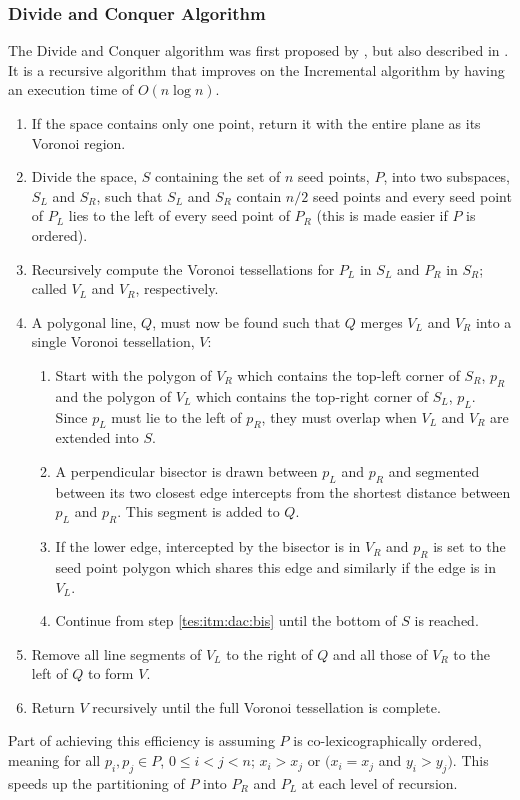 \subsubsection{Divide and Conquer Algorithm}\label{tes:ssec:dac}
The Divide and Conquer algorithm was first proposed by \citet{shamos1975closest}, but also described in \citep{okabe2009spatial}. It is a recursive algorithm that improves on the Incremental algorithm by having an execution time of $O(n\log n)$.
\begin{enumerate}
\item If the space contains only one point, return it with the entire plane as its Voronoi region.
\item Divide the space, $S$ containing the set of $n$ seed points, $P$, into two subspaces, $S_L$ and $S_R$, such that $S_L$ and $S_R$ contain $n/2$ seed points and every seed point of $P_L$ lies to the left of every seed point of $P_R$ (this is made easier if $P$ is ordered).
\item Recursively compute the Voronoi tessellations for $P_L$ in $S_L$ and $P_R$ in $S_R$; called $V_L$ and $V_R$, respectively.
\item A polygonal line, $Q$, must now be found such that $Q$ merges $V_L$ and $V_R$ into a single Voronoi tessellation, $V$:
\begin{enumerate}
 \item Start with the polygon of $V_R$ which contains the top-left corner of $S_R$, $p_R$ and the polygon of $V_L$ which contains the top-right corner of $S_L$, $p_L$. Since $p_L$ must lie to the left of $p_R$, they must overlap when $V_L$ and $V_R$ are extended into $S$.
 \item\label{tes:itm:dac:bis} A perpendicular bisector is drawn between $p_L$ and $p_R$ and segmented between its two closest edge intercepts from the shortest distance between $p_L$ and $p_R$. This segment is added to $Q$.
 \item If the lower edge, intercepted by the bisector is in $V_R$ and $p_R$ is set to the seed point polygon which shares this edge and similarly if the edge is in $V_L$.
 \item Continue from step \ref{tes:itm:dac:bis} until the bottom of $S$ is reached.
\end{enumerate}
\item Remove all line segments of $V_L$ to the right of $Q$ and all those of $V_R$ to the left of $Q$ to form $V$.
\item Return $V$ recursively until the full Voronoi tessellation is complete.
\end{enumerate}
Part of achieving this efficiency is assuming $P$ is co-lexicographically ordered, meaning for all $p_i,p_j \in P$, $0 \leq i < j < n$; $x_i > x_j$ or $(x_i = x_j$ and $y_i > y_j)$. This speeds up the partitioning of $P$ into $P_R$ and $P_L$ at each level of recursion.
%
